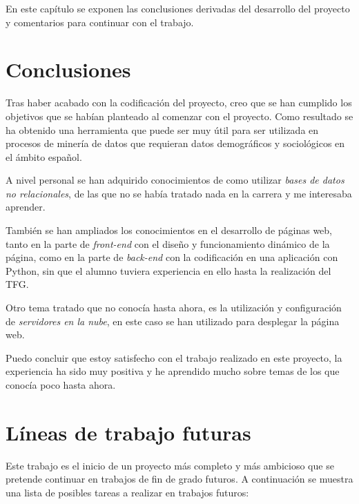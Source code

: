 
En este capítulo se exponen las conclusiones derivadas del desarrollo del proyecto y comentarios para continuar con el trabajo.

\section{Conclusiones}

Tras haber acabado con la codificación del proyecto, creo que se han cumplido los objetivos que se habían planteado al comenzar con el proyecto. Como resultado se ha obtenido una herramienta que puede ser muy útil para ser utilizada en procesos de minería de datos que requieran datos demográficos y sociológicos en el ámbito español.

A nivel personal se han adquirido conocimientos de como utilizar \textit{bases de datos no relacionales}, de las que no se había tratado nada en la carrera y me interesaba aprender.

También se han ampliados los conocimientos en el desarrollo de páginas web, tanto en la parte de \textit{front-end} con el diseño y funcionamiento dinámico de la página, como en la parte de \textit{back-end} con la codificación en una aplicación con Python, sin que el alumno tuviera experiencia en ello hasta la realización del TFG.

Otro tema tratado que no conocía hasta ahora, es la utilización y configuración de \textit{servidores en la nube}, en este caso se han utilizado para desplegar la página web.

Puedo concluir que estoy satisfecho con el trabajo realizado en este proyecto, la experiencia ha sido muy positiva y he aprendido mucho sobre temas de los que conocía poco hasta ahora.

\section{Líneas de trabajo futuras}

Este trabajo es el inicio de un proyecto más completo y más ambicioso que se pretende continuar en trabajos de fin de grado futuros. A continuación se muestra una lista de posibles tareas a realizar en trabajos futuros:

